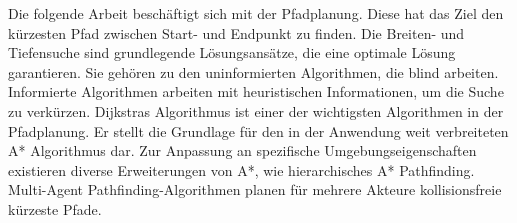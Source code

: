 \kurzfassung

Die folgende Arbeit beschäftigt sich mit der Pfadplanung. Diese hat das Ziel den kürzesten Pfad zwischen Start- und Endpunkt zu finden. Die Breiten- und Tiefensuche sind grundlegende Lösungsansätze, die eine optimale Lösung garantieren. Sie gehören zu den uninformierten Algorithmen, die blind arbeiten. Informierte Algorithmen arbeiten mit heuristischen Informationen, um die Suche zu verkürzen. Dijkstras Algorithmus ist einer der wichtigsten Algorithmen in der Pfadplanung. Er stellt die Grundlage für den in der Anwendung weit verbreiteten A* Algorithmus dar. Zur Anpassung an spezifische Umgebungseigenschaften existieren diverse Erweiterungen von A*, wie hierarchisches A* Pathfinding. Multi-Agent Pathfinding-Algorithmen planen für mehrere Akteure kollisionsfreie kürzeste Pfade.
